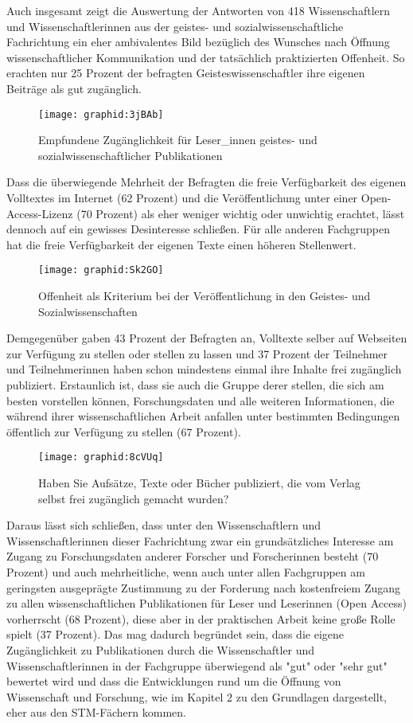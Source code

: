 Auch insgesamt zeigt die Auswertung der Antworten von 418 Wissenschaftlern und Wissenschaftlerinnen aus der geistes- und sozialwissenschaftliche Fachrichtung ein eher ambivalentes Bild bezüglich des Wunsches nach Öffnung wissenschaftlicher Kommunikation und der tatsächlich praktizierten Offenheit. So erachten nur 25 Prozent der befragten Geisteswissenschaftler ihre eigenen Beiträge als gut zugänglich.

\begin{figure}[h!]
\texttt{[image: graphid:3jBAb]}
\caption{Empfundene Zugänglichkeit für Leser_innen geistes- und sozialwissenschaftlicher Publikationen}
\end{figure}

Dass die überwiegende Mehrheit der Befragten die freie Verfügbarkeit des eigenen Volltextes im Internet (62 Prozent) und die Veröffentlichung unter einer Open-Access-Lizenz (70 Prozent) als eher weniger wichtig oder unwichtig erachtet, lässt dennoch auf ein gewisses Desinteresse schließen. Für alle anderen Fachgruppen hat die freie Verfügbarkeit der eigenen Texte einen höheren Stellenwert.

\begin{figure}[h!]
\texttt{[image: graphid:Sk2GO]}
\caption{Offenheit als Kriterium bei der Veröffentlichung in den Geistes- und Sozialwissenschaften}
\end{figure}

Demgegenüber gaben 43 Prozent der Befragten an, Volltexte selber auf Webseiten zur Verfügung zu stellen oder stellen zu lassen und 37 Prozent der Teilnehmer und Teilnehmerinnen haben schon mindestens einmal ihre Inhalte frei zugänglich publiziert. Erstaunlich ist, dass sie auch die Gruppe derer stellen, die sich am besten vorstellen können, Forschungsdaten und alle weiteren Informationen, die während ihrer wissenschaftlichen Arbeit anfallen unter bestimmten Bedingungen öffentlich zur Verfügung zu stellen (67 Prozent).

\begin{figure}[h!]
\texttt{[image: graphid:8cVUq]}
\caption{Haben Sie Aufsätze, Texte oder Bücher publiziert, die vom Verlag selbst frei zugänglich gemacht wurden?}
\end{figure}

Daraus lässt sich schließen, dass unter den Wissenschaftlern und Wissenschaftlerinnen dieser Fachrichtung zwar ein grundsätzliches Interesse am Zugang zu Forschungsdaten anderer Forscher und Forscherinnen besteht (70 Prozent) und auch mehrheitliche, wenn auch unter allen Fachgruppen am geringsten ausgeprägte Zustimmung zu der Forderung nach kostenfreiem Zugang zu allen wissenschaftlichen Publikationen für Leser und Leserinnen (Open Access) vorherrscht (68 Prozent), diese aber in der praktischen Arbeit keine große Rolle spielt (37 Prozent). Das mag dadurch begründet sein, dass die eigene Zugänglichkeit zu Publikationen durch die Wissenschaftler und Wissenschaftlerinnen in der Fachgruppe überwiegend als "gut" oder "sehr gut" bewertet wird und dass die Entwicklungen rund um die Öffnung von Wissenschaft und Forschung, wie im Kapitel 2 zu den Grundlagen dargestellt, eher aus den STM-Fächern kommen.

